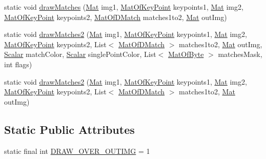 \begin{DoxyCompactItemize}
static void \mbox{\hyperlink{classorg_1_1opencv_1_1features2d_1_1_features2d_acb206c3f82cbc4a4a934cbc0270b4e27}{draw\+Matches}} (\mbox{\hyperlink{classorg_1_1opencv_1_1core_1_1_mat}{Mat}} img1, \mbox{\hyperlink{classorg_1_1opencv_1_1core_1_1_mat_of_key_point}{Mat\+Of\+Key\+Point}} keypoints1, \mbox{\hyperlink{classorg_1_1opencv_1_1core_1_1_mat}{Mat}} img2, \mbox{\hyperlink{classorg_1_1opencv_1_1core_1_1_mat_of_key_point}{Mat\+Of\+Key\+Point}} keypoints2, \mbox{\hyperlink{classorg_1_1opencv_1_1core_1_1_mat_of_d_match}{Mat\+Of\+D\+Match}} matches1to2, \mbox{\hyperlink{classorg_1_1opencv_1_1core_1_1_mat}{Mat}} out\+Img)
\item 
static void \mbox{\hyperlink{classorg_1_1opencv_1_1features2d_1_1_features2d_a78f7423d62db8aeb62da393422ac7d80}{draw\+Matches2}} (\mbox{\hyperlink{classorg_1_1opencv_1_1core_1_1_mat}{Mat}} img1, \mbox{\hyperlink{classorg_1_1opencv_1_1core_1_1_mat_of_key_point}{Mat\+Of\+Key\+Point}} keypoints1, \mbox{\hyperlink{classorg_1_1opencv_1_1core_1_1_mat}{Mat}} img2, \mbox{\hyperlink{classorg_1_1opencv_1_1core_1_1_mat_of_key_point}{Mat\+Of\+Key\+Point}} keypoints2, List$<$ \mbox{\hyperlink{classorg_1_1opencv_1_1core_1_1_mat_of_d_match}{Mat\+Of\+D\+Match}} $>$ matches1to2, \mbox{\hyperlink{classorg_1_1opencv_1_1core_1_1_mat}{Mat}} out\+Img, \mbox{\hyperlink{classorg_1_1opencv_1_1core_1_1_scalar}{Scalar}} match\+Color, \mbox{\hyperlink{classorg_1_1opencv_1_1core_1_1_scalar}{Scalar}} single\+Point\+Color, List$<$ \mbox{\hyperlink{classorg_1_1opencv_1_1core_1_1_mat_of_byte}{Mat\+Of\+Byte}} $>$ matches\+Mask, int flags)
\item 
static void \mbox{\hyperlink{classorg_1_1opencv_1_1features2d_1_1_features2d_ab79e33df6be07e46bf9b9fa9556d5aaa}{draw\+Matches2}} (\mbox{\hyperlink{classorg_1_1opencv_1_1core_1_1_mat}{Mat}} img1, \mbox{\hyperlink{classorg_1_1opencv_1_1core_1_1_mat_of_key_point}{Mat\+Of\+Key\+Point}} keypoints1, \mbox{\hyperlink{classorg_1_1opencv_1_1core_1_1_mat}{Mat}} img2, \mbox{\hyperlink{classorg_1_1opencv_1_1core_1_1_mat_of_key_point}{Mat\+Of\+Key\+Point}} keypoints2, List$<$ \mbox{\hyperlink{classorg_1_1opencv_1_1core_1_1_mat_of_d_match}{Mat\+Of\+D\+Match}} $>$ matches1to2, \mbox{\hyperlink{classorg_1_1opencv_1_1core_1_1_mat}{Mat}} out\+Img)
\end{DoxyCompactItemize}
\subsection*{Static Public Attributes}
\begin{DoxyCompactItemize}
\item 
static final int \mbox{\hyperlink{classorg_1_1opencv_1_1features2d_1_1_features2d_a59281eeb31593e93d86dd986ff6ef7d8}{D\+R\+A\+W\+\_\+\+O\+V\+E\+R\+\_\+\+O\+U\+T\+I\+MG}} = 1
\end{DoxyCompactItemize}


